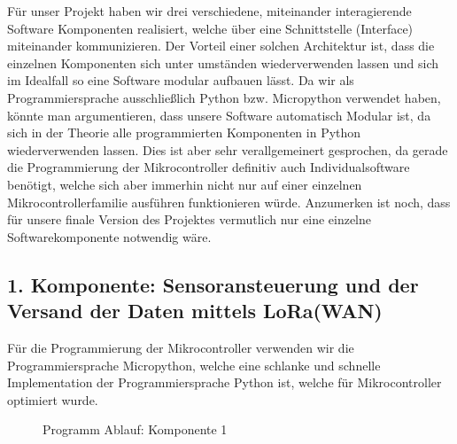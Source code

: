 Für unser Projekt haben wir drei verschiedene, miteinander interagierende Software Komponenten realisiert, welche über eine Schnittstelle (Interface) miteinander kommunizieren. 
Der Vorteil einer solchen Architektur ist, dass die einzelnen Komponenten sich unter umständen wiederverwenden lassen und sich im Idealfall so eine Software modular aufbauen lässt.
Da wir als Programmiersprache ausschließlich Python bzw. Micropython verwendet haben, könnte man argumentieren, dass unsere Software automatisch Modular ist, da sich in der Theorie alle programmierten Komponenten in Python wiederverwenden lassen.
Dies ist aber sehr verallgemeinert gesprochen, da gerade die Programmierung der Mikrocontroller definitiv auch Individualsoftware benötigt, welche sich aber immerhin nicht nur auf einer einzelnen Mikrocontrollerfamilie ausführen funktionieren würde.
Anzumerken ist noch, dass für unsere finale Version des Projektes vermutlich nur eine einzelne Softwarekomponente notwendig wäre.


\subsection{1. Komponente: Sensoransteuerung und der Versand der Daten mittels LoRa(WAN)} \label{Sender}

Für die Programmierung der Mikrocontroller verwenden wir die Programmiersprache Micropython, welche eine schlanke und schnelle Implementation der Programmiersprache Python ist, welche für Mikrocontroller optimiert wurde.

\begin{center}
	\begin{figure}[h]
	 
	 \noindent{}
	 \caption[PAP komponente 1]{Programm Ablauf: Komponente 1}
	 \label{fig:zeitplanung}
	\end{figure}
\end{center}

